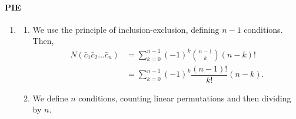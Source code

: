 \documentclass[12pt]{article}
\begin{document}
\paragraph{PIE}
\begin{enumerate}
  \item
    \begin{enumerate}
      \item We use the principle of inclusion-exclusion, defining
        $n-1$ conditions. Then,
        \begin{align*}
          N(\bar c_1 \bar c_2 \ldots \bar c_n) &= \sum_{k =
          0}^{n-1}(-1)^k {n-1 \choose k} (n - k)! \\
          &= \sum_{k=0}^{n-1}(-1)^k \dfrac{(n-1)!}{k! }(n-k).
        \end{align*}

      \item We define $n$ conditions, counting linear permutations
        and then dividing by $n.$
    \end{enumerate}
\end{enumerate}
\end{document}
